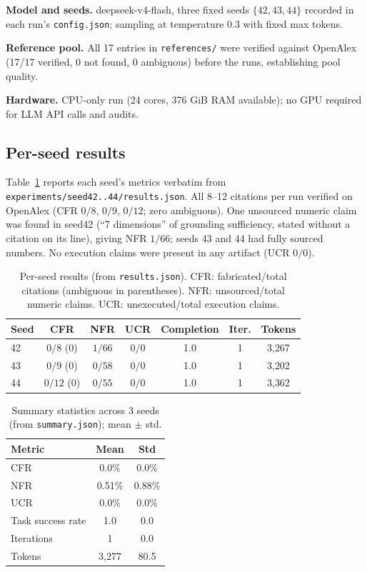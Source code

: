 \documentclass[10pt,twocolumn]{article}
\begin{document}
\textbf{Model and seeds.} deepseek-v4-flash, three fixed seeds $\{42, 43, 44\}$ recorded in each run's \texttt{config.json}; sampling at temperature 0.3 with fixed max tokens.

\textbf{Reference pool.} All 17 entries in \texttt{references/} were verified against OpenAlex (17/17 verified, 0 not found, 0 ambiguous) before the runs, establishing pool quality.

\textbf{Hardware.} CPU-only run (24 cores, 376 GiB RAM available); no GPU required for LLM API calls and audits.

\subsection{Per-seed results}
Table~\ref{tab:per_seed} reports each seed's metrics verbatim from \texttt{experiments/seed42..44/results.json}. All 8--12 citations per run verified on OpenAlex (CFR $0/8$, $0/9$, $0/12$; zero ambiguous). One unsourced numeric claim was found in seed42 (``7 dimensions'' of grounding sufficiency, stated without a citation on its line), giving NFR $1/66$; seeds 43 and 44 had fully sourced numbers. No execution claims were present in any artifact (UCR $0/0$).

\begin{table}[t]
\caption{Per-seed results (from \texttt{results.json}). CFR: fabricated/total citations (ambiguous in parentheses). NFR: unsourced/total numeric claims. UCR: unexecuted/total execution claims.}
\label{tab:per_seed}
\centering
\small
\begin{tabular}{lcccccc}
\toprule
Seed & CFR & NFR & UCR & Completion & Iter. & Tokens \\
\midrule
42 & $0/8$ (0) & $1/66$ & $0/0$ & 1.0 & 1 & 3{,}267 \\
43 & $0/9$ (0) & $0/58$ & $0/0$ & 1.0 & 1 & 3{,}202 \\
44 & $0/12$ (0) & $0/55$ & $0/0$ & 1.0 & 1 & 3{,}362 \\
\bottomrule
\end{tabular}
\end{table}

\begin{table}[t]
\caption{Summary statistics across 3 seeds (from \texttt{summary.json}); mean $\pm$ std.}
\label{tab:summary}
\centering
\small
\begin{tabular}{lcc}
\toprule
Metric & Mean & Std \\
\midrule
CFR & 0.0\% & 0.0\% \\
NFR & 0.51\% & 0.88\% \\
UCR & 0.0\% & 0.0\% \\
Task success rate & 1.0 & 0.0 \\
Iterations & 1 & 0.0 \\
Tokens & 3{,}277 & 80.5 \\
\bottomrule
\end{tabular}
\end{table}
\end{document}
